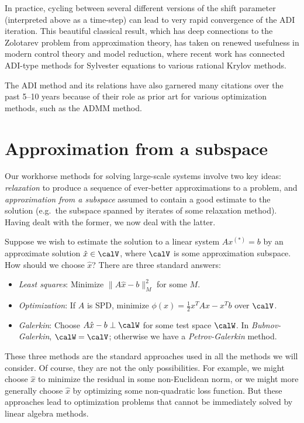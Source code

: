 \documentclass[12pt, leqno]{article} %
\begin{document}
In practice, cycling between several different versions of the shift parameter
(interpreted above as a time-step) can lead to very rapid convergence of
the ADI iteration.  This beautiful classical result, which has deep
connections to the Zolotarev problem from approximation theory, has taken
on renewed usefulness in modern control theory and model reduction,
where recent work has connected ADI-type methods for Sylvester equations
to various rational Krylov methods.

The ADI method and its relations have also garnered many citations over
the past 5--10 years because of their role as prior art for various
optimization methods, such as the ADMM method.

\section{Approximation from a subspace}

Our workhorse methods for solving large-scale systems involve two
key ideas: {\em relaxation} to produce a sequence of ever-better
approximations to a problem, and {\em approximation from a subspace}
assumed to contain a good estimate to the solution (e.g.~the subspace
spanned by iterates of some relaxation method).  Having dealt with the
former, we now deal with the latter.

Suppose we wish to estimate the solution to a linear system $Ax^{(*)} = b$ by
an approximate solution $\hat{x} \in \calV$, where $\calV$ is some
approximation subspace.  How should we choose $\hat{x}$?  There are
three standard answers:
\begin{itemize}
\item {\em Least squares}: Minimize $\|A\hat{x}-b\|_M^2$ for some $M$.
\item {\em Optimization}: If $A$ is SPD, minimize $\phi(x) = \frac{1}{2} x^T A x - x^T b$ over $\calV$.
\item {\em Galerkin}: Choose $A\hat{x}-b \perp \calW$ for some test space $\calW$.  In {\em Bubnov-Galerkin}, $\calW = \calV$; otherwise we have
a {\em Petrov-Galerkin} method.
\end{itemize}
These three methods are the standard approaches used in all the methods
we will consider.  Of course, they are not the only possibilities.
For example, we might choose $\hat{x}$ to minimize the residual in
some non-Euclidean norm, or we might more generally choose $\hat{x}$
by optimizing some non-quadratic loss function.  But these approaches lead
to optimization problems that cannot be immediately solved by linear
algebra methods.
\end{document}
